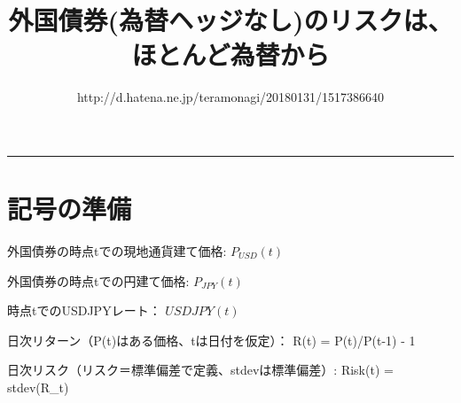 \documentclass[uplatex,a4paper]{jsarticle}
\title{外国債券(為替ヘッジなし)のリスクは、ほとんど為替から}
\author{http://d.hatena.ne.jp/teramonagi/20180131/1517386640}
\date{}
\begin{document}
\maketitle
\hrule
\medskip

\section{記号の準備}
外国債券の時点tでの現地通貨建て価格: $P_{USD}(t)$

外国債券の時点tでの円建て価格:  $P_{JPY}(t)$

時点tでのUSDJPYレート： $USDJPY(t)$

日次リターン（P(t)はある価格、tは日付を仮定）： R(t) = P(t)/P(t-1) - 1

日次リスク（リスク＝標準偏差で定義、stdevは標準偏差）:  Risk(t) = stdev(R_t)
\end{document}
